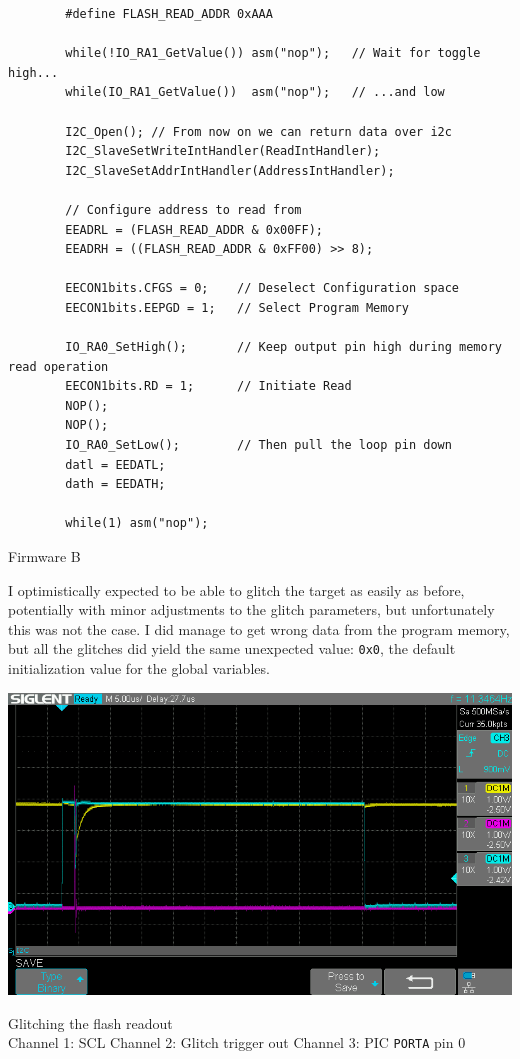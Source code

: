 \documentclass[a4paper,english,twoside,10pt]{article}
\begin{document}
\begin{flushleft}
	\captionsetup{type=listing}
	\begin{verbatim}
		#define FLASH_READ_ADDR 0xAAA
	
		while(!IO_RA1_GetValue()) asm("nop");   // Wait for toggle high...
		while(IO_RA1_GetValue())  asm("nop");   // ...and low
	
		I2C_Open(); // From now on we can return data over i2c
		I2C_SlaveSetWriteIntHandler(ReadIntHandler);
		I2C_SlaveSetAddrIntHandler(AddressIntHandler);
	
		// Configure address to read from
		EEADRL = (FLASH_READ_ADDR & 0x00FF);
		EEADRH = ((FLASH_READ_ADDR & 0xFF00) >> 8);
	
		EECON1bits.CFGS = 0;    // Deselect Configuration space
		EECON1bits.EEPGD = 1;   // Select Program Memory
	
		IO_RA0_SetHigh();       // Keep output pin high during memory read operation
		EECON1bits.RD = 1;      // Initiate Read
		NOP();
		NOP();
		IO_RA0_SetLow();        // Then pull the loop pin down
		datl = EEDATL;
		dath = EEDATH;
	
		while(1) asm("nop");
	\end{verbatim}
	\caption{Firmware B}\label{lst:flash_readout}
\end{flushleft}

I optimistically expected to be able to glitch the target as easily as before, potentially with minor adjustments to the glitch parameters, but unfortunately this was not the case. I did manage to get wrong data from the program memory, but all the glitches did yield the same unexpected value: \texttt{0x0}, the default initialization value for the global variables.

\begin{center}
	\captionsetup{type=figure}
	\includegraphics[width=.75\textwidth]{flash_glitches/scope_trace.png}
	\caption{Glitching the flash readout\\Channel 1: SCL \quad Channel 2: Glitch trigger out \quad Channel 3: PIC \texttt{PORTA} pin 0}
	\label{fig:flash_glitch_trace}
\end{center}
\end{document}
